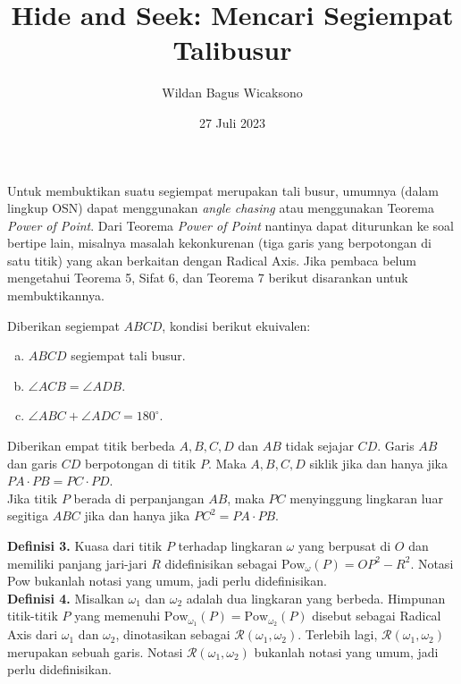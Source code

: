 \documentclass[a4paper, 11pt]{article}
\title{\textbf{Hide and Seek: Mencari Segiempat Talibusur}}
\author{Wildan Bagus Wicaksono}
\date{27 Juli 2023}
\begin{document}
\maketitle

Untuk membuktikan suatu segiempat merupakan tali busur, umumnya (dalam lingkup OSN) dapat menggunakan \textit{angle chasing} atau menggunakan Teorema \textit{Power of Point}. Dari Teorema \textit{Power of Point} nantinya dapat diturunkan ke soal bertipe lain, misalnya masalah kekonkurenan (tiga garis yang berpotongan di satu titik) yang akan berkaitan dengan Radical Axis. Jika pembaca belum mengetahui Teorema 5, Sifat 6, dan Teorema 7 berikut disarankan untuk membuktikannya.
\begin{tcolorbox}[colback=blue!5!white,colframe=blue!75!black,title=\textbf{Teorema 1}]
  Diberikan segiempat $ABCD$, kondisi berikut ekuivalen:
\begin{enumerate}[(a).]
\item $ABCD$ segiempat tali busur.
\item $\angle ACB=\angle ADB$.
\item $\angle ABC+\angle ADC=180^\circ$.
\end{enumerate}
\end{tcolorbox}
\begin{tcolorbox}[colback=blue!5!white,colframe=blue!75!black,title=\textbf{Teorema 2: Power of Point Theorem}]
 Diberikan empat titik berbeda $A,B,C,D$ dan $AB$ tidak sejajar $CD$. Garis $AB$ dan garis $CD$ berpotongan di titik $P$. Maka $A,B,C,D$ siklik jika dan hanya jika $PA\cdot PB=PC\cdot PD$.\\
Jika titik $P$ berada di perpanjangan $AB$, maka $PC$ menyinggung lingkaran luar segitiga $ABC$ jika dan hanya jika $PC^2=PA\cdot PB$.
\end{tcolorbox}
\noindent\textbf{Definisi 3.} Kuasa dari titik $P$ terhadap lingkaran $\omega$ yang berpusat di $O$ dan memiliki panjang jari-jari $R$ didefinisikan sebagai $\text{Pow}_\omega(P)=OP^2-R^2$. Notasi Pow bukanlah notasi yang umum, jadi perlu didefinisikan.\\
\textbf{Definisi 4.} Misalkan $\omega_1$ dan $\omega_2$ adalah dua lingkaran yang berbeda. Himpunan titik-titik $P$ yang memenuhi $\text{Pow}_{\omega_1}(P)=\text{Pow}_{\omega_2}(P)$ disebut sebagai Radical Axis dari $\omega_1$ dan $\omega_2$, dinotasikan sebagai $\mathcal{R}(\omega_1,\omega_2)$. Terlebih lagi, $\mathcal{R}(\omega_1,\omega_2)$ merupakan sebuah garis. Notasi $\mathcal{R}(\omega_1,\omega_2)$ bukanlah notasi yang umum, jadi perlu didefinisikan.
\end{document}

